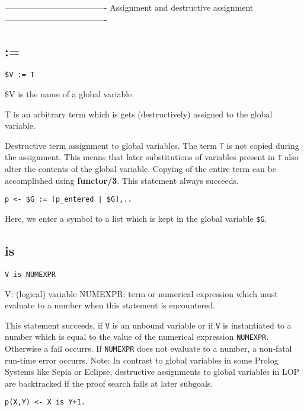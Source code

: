-------------------------------------
Assignment and destructive assignment 
-------------------------------------

\subsection{:=}

{\tt \$V := T}

\$V is the name of a global variable.

T is an arbitrary term which is gets (destructively) assigned
to the global variable.


Destructive term assignment to global variables. 
The term {\tt T} is not copied during the assignment.
This means that later substitutions of variables present in {\tt T}
also alter the contents of the global variable.
Copying of the entire term can be accomplished using 
{\bf functor/3}.
This statement always succeeds.
\begin{verbatim}
p <- $G := [p_entered | $G],..
\end{verbatim}

Here, we enter a symbol to a list which is kept in the global
variable {\tt \$G}.

\subsection{is}

{\tt V is NUMEXPR}

V: (logical) variable
NUMEXPR: term or numerical expression which must evaluate to a number
	when this statement is encountered.

This statement succeeds, if {\tt V} is an unbound variable or
if {\tt V} is instantiated to a number which is equal to the value
of the numerical expression {\tt NUMEXPR}.
Otherwise a fail occurrs.
If {\tt NUMEXPR} does not evaluate to a number, a non-fatal run-time
error occurrs.
   Note: In contrast to global variables in some Prolog Systems
   	 like Sepia or Eclipse, destructive assignments to
	 global variables in LOP are backtracked if the proof 
	 search fails at later subgoals.
\begin{verbatim}
p(X,Y) <- X is Y+1.
\end{verbatim}

